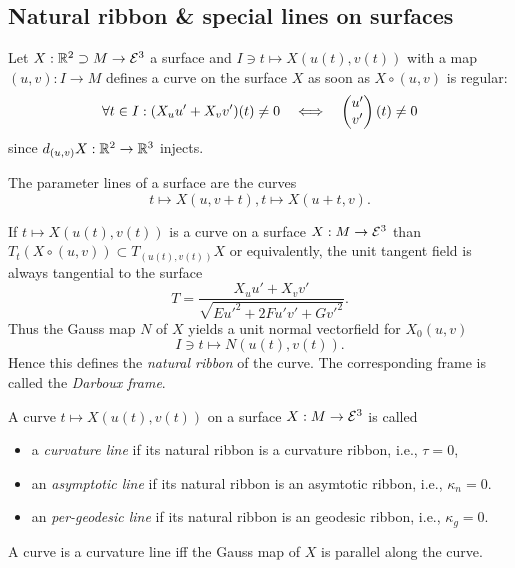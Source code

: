 \subsection{Natural ribbon \& special lines on surfaces}

\begin{definition}
	Let $X: \mathbb R^2 \supset M \to \mathcal E^3$ a surface and $I \ni t \mapsto X(u(t),v(t))$ with a map $(u,v):I \to M$ defines a curve on the surface $X$ as soon as $X \circ (u,v)$ is regular:
		\[ \forall t \in I: (X_uu' + X_vv') (t) \neq 0 \quad \Longleftrightarrow \quad
			\begin{pmatrix} u'\\v' \end{pmatrix}(t) \neq 0 \]
	since $d_{(u,v)} X: \mathbb R^2 \to \mathbb R^3$ injects.
\end{definition}

\begin{example}
	The parameter lines of a surface are the curves
		\[ t \mapsto X(u,v+t), t \mapsto X(u+t,v). \]
\end{example}

\begin{remark, definition}
	If $t \mapsto X(u(t),v(t))$ is a curve on a surface $X: M \to \mathcal E^3$ than $T_t(X \circ (u,v)) \subset T_{(u(t),v(t))}X$
	or equivalently, the unit tangent field is always tangential to the surface
		\[ T= \frac {X_uu' + X_vv'}{\sqrt{Eu'^2 + 2Fu'v' + Gv'^2}}. \]
	Thus the Gauss map $N$ of $X$ yields a unit normal vectorfield for $X_0(u,v)$ 
		\[ I \ni t \mapsto N(u(t),v(t)). \]
	Hence this defines the \emph{natural ribbon} of the curve. The corresponding frame is called the \emph{Darboux frame}.
\end{remark, definition}

\begin{definition}
	A curve $t \mapsto X(u(t),v(t))$ on a surface $X: M \to \mathcal E^3$ is called
	\begin{itemize}
		\item a \emph{curvature line} if its natural ribbon is a curvature ribbon, i.e., $\tau = 0$,
		\item  an \emph{asymptotic line} if its natural ribbon is an asymtotic ribbon, i.e., $\kappa_n = 0$.
		\item  an \emph{per-geodesic line} if its natural ribbon is an geodesic ribbon, i.e., $\kappa_g = 0$.
	\end{itemize}
\end{definition}

\begin{remark}
	A curve is a curvature line iff the Gauss map of $X$ is parallel along the curve.
\end{remark}

